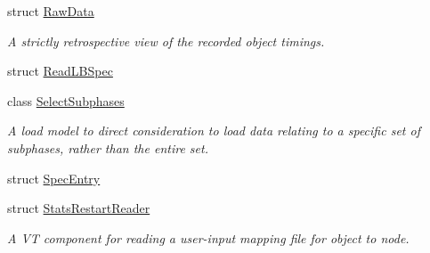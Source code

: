 \begin{DoxyCompactItemize}
struct \hyperlink{structvt_1_1vrt_1_1collection_1_1balance_1_1_raw_data}{Raw\+Data}
\begin{DoxyCompactList}\small\item\em A strictly retrospective view of the recorded object timings. \end{DoxyCompactList}\item 
struct \hyperlink{structvt_1_1vrt_1_1collection_1_1balance_1_1_read_l_b_spec}{Read\+L\+B\+Spec}
\item 
class \hyperlink{classvt_1_1vrt_1_1collection_1_1balance_1_1_select_subphases}{Select\+Subphases}
\begin{DoxyCompactList}\small\item\em A load model to direct consideration to load data relating to a specific set of subphases, rather than the entire set. \end{DoxyCompactList}\item 
struct \hyperlink{structvt_1_1vrt_1_1collection_1_1balance_1_1_spec_entry}{Spec\+Entry}
\item 
struct \hyperlink{structvt_1_1vrt_1_1collection_1_1balance_1_1_stats_restart_reader}{Stats\+Restart\+Reader}
\begin{DoxyCompactList}\small\item\em A VT component for reading a user-\/input mapping file for object to node. \end{DoxyCompactList}\end{DoxyCompactItemize}
